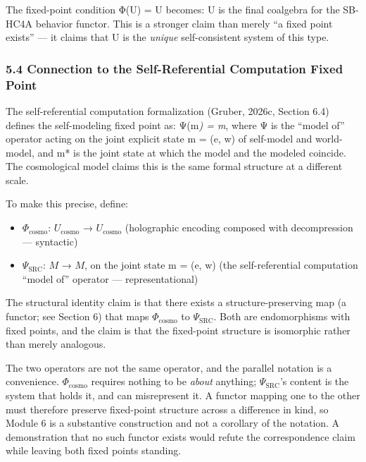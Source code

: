 \documentclass[
]{article}
\providecommand{\tightlist}{%
  \setlength{\itemsep}{0pt}\setlength{\parskip}{0pt}}
\begin{document}
The fixed-point condition Φ(U) = U becomes: U is the final coalgebra for
the SB-HC4A behavior functor. This is a stronger claim than merely ``a
fixed point exists'' --- it claims that U is the \emph{unique}
self-consistent system of this type.

\hypertarget{connection-to-the-self-referential-computation-fixed-point}{%
\subsubsection{5.4 Connection to the Self-Referential Computation Fixed
Point}\label{connection-to-the-self-referential-computation-fixed-point}}

The self-referential computation formalization (Gruber, 2026c, Section
6.4) defines the self-modeling fixed point as: Ψ(m\emph{) = m}, where Ψ
is the ``model of'' operator acting on the joint explicit state m = (e,
w) of self-model and world-model, and m* is the joint state at which the
model and the modeled coincide. The cosmological model claims this is
the same formal structure at a different scale.

To make this precise, define:

\begin{itemize}
\tightlist
\item
  \(\Phi_{\mathrm{cosmo}}\): \(U_{\mathrm{cosmo}}\) →
  \(U_{\mathrm{cosmo}}\) (holographic encoding composed with
  decompression --- syntactic)
\item
  \(\Psi_{\mathrm{SRC}}\): \(M\) → \(M\), on the joint state m = (e, w)
  (the self-referential computation ``model of'' operator ---
  representational)
\end{itemize}

The structural identity claim is that there exists a
structure-preserving map (a functor; see Section 6) that maps
\(\Phi_{\mathrm{cosmo}}\) to \(\Psi_{\mathrm{SRC}}\). Both are
endomorphisms with fixed points, and the claim is that the fixed-point
structure is isomorphic rather than merely analogous.

The two operators are not the same operator, and the parallel notation
is a convenience. \(\Phi_{\mathrm{cosmo}}\) requires nothing to be
\emph{about} anything; \(\Psi_{\mathrm{SRC}}\)'s content is the system
that holds it, and can misrepresent it. A functor mapping one to the
other must therefore preserve fixed-point structure across a difference
in kind, so Module 6 is a substantive construction and not a corollary
of the notation. A demonstration that no such functor exists would
refute the correspondence claim while leaving both fixed points
standing.
\end{document}
